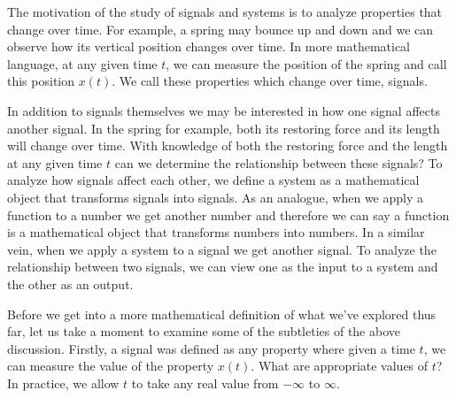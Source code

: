 \documentclass{article}
\begin{document}
The motivation of the study of signals and systems is to analyze properties that change over time. 
For example, a spring may bounce up and down and we can observe how its vertical position changes over time. 
In more mathematical language, at any given time $t$, we can measure the position of the spring and call this position $x(t)$.
We call these properties which change over time, signals.

In addition to signals themselves we may be interested in how one signal affects another signal. 
In the spring for example, both its restoring force and its length will change over time.
With knowledge of both the restoring force and the length at any given time $t$ can we determine the relationship between these signals?
To analyze how signals affect each other, we define a system as a mathematical object that transforms signals into signals. 
As an analogue, when we apply a function to a number we get another number and therefore we can say a function is a mathematical object that transforms numbers into numbers.
In a similar vein, when we apply a system to a signal we get another signal. 
To analyze the relationship between two signals, we can view one as the input to a system and the other as an output.

Before we get into a more mathematical definition of what we've explored thus far, let us take a moment to examine some of the subtleties of the above discussion. 
Firstly, a signal was defined as any property where given a time $t$, we can measure the value of the property $x(t)$.
What are appropriate values of $t$?
In practice, we allow $t$ to take any real value from $-\infty$ to $\infty$.
\end{document}
